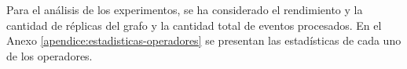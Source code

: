 \normalsize{Para el análisis de los experimentos, se ha considerado el rendimiento y la cantidad de réplicas del grafo y la cantidad total de eventos procesados. En el Anexo} \ref{apendice:estadisticas-operadores} \normalsize{se presentan las estadísticas de cada uno de los operadores.}


%
%
%
